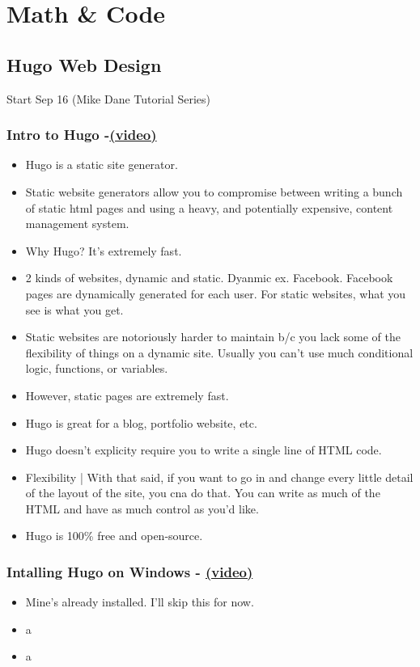 \chapter{Math \& Code}


\section{Hugo Web Design}

Start Sep 16 (Mike Dane Tutorial Series)

\subsection{Intro to Hugo -\href{https://youtu.be/qtIqKaDlqXo}{(video)} }
\begin{itemize}
	\item
	Hugo is a static site generator.
	\item
	Static website generators allow you to compromise between writing a bunch of static html pages and using a heavy, and potentially expensive, content management system.
	\item
	Why Hugo? It's extremely fast.
	\item
	2 kinds of websites, dynamic and static. Dyanmic ex. Facebook. Facebook pages are dynamically generated for each user. For static websites, what you see is what you get.
	\item
	Static websites are notoriously harder to maintain b/c you lack some of the flexibility of things  on a dynamic site. Usually you can't use much conditional logic, functions, or variables.
	\item
	However, static pages are extremely fast.
	\item
	Hugo is great for a blog, portfolio website, etc.
	\item
	Hugo doesn't explicity require you to write a single line of HTML code.
	\item
	Flexibility | With that said, if you want to go in and change every little detail of the layout of the site, you cna do that. You can write as much of the HTML and have as much control as you'd like.
	\item
	Hugo is 100\% free and open-source.
\end{itemize}

\subsection{Intalling Hugo on Windows - \href{https://youtu.be/G7umPCU-8xc?list=PLLAZ4kZ9dFpOnyRlyS-liKL5ReHDcj4G3}{(video)} }
\begin{itemize}
	\item
	Mine's already installed. I'll skip this for now.
	\item
	a
	\item
	a
\end{itemize}

